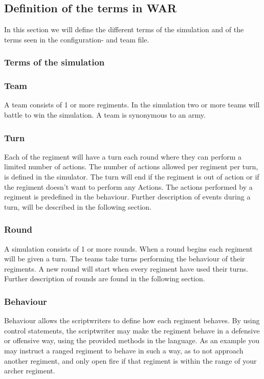 		 
	\subsection{Definition of the terms in WAR}
	In this section we will define the different terms of the simulation and of the terms seen in the configuration- and team file.
	
		\subsubsection{Terms of the simulation}
		
		\subsubsection{Team}		
		A team consists of 1 or more regiments. In the simulation two or more teams will battle to win the simulation. A team is synonymous to an army.
		
		\subsubsection{Turn}
		Each of the regiment will have a turn each round where they can perform a limited number of actions. The number of actions allowed per regiment per turn, is defined in the simulator.
		The turn will end if the regiment is out of action or if the regiment doesn't want to perform any Actions. 
		The actions performed by a regiment is predefined in the behaviour. 
		Further description of events during a turn, will be described in the following section.
		
		\subsubsection{Round}
		A simulation consists of 1 or more rounds. When a round begins each regiment will be given a turn.
		The teams take turns performing the behaviour of their regiments. 
		A new round will start when every regiment have used their turns.
		Further description of rounds are found in the following section.

		\subsubsection{Behaviour}
		Behaviour allows the scriptwriters to define how each regiment behaves. 
		By using control statements, the scriptwriter may make the regiment behave in a defensive or offensive way, 
		using the provided methods in the language. As an example you may instruct a ranged regiment to behave in such a way, 
		as to not approach another regiment, and only open fire if that regiment is within the range of your archer regiment.
				

